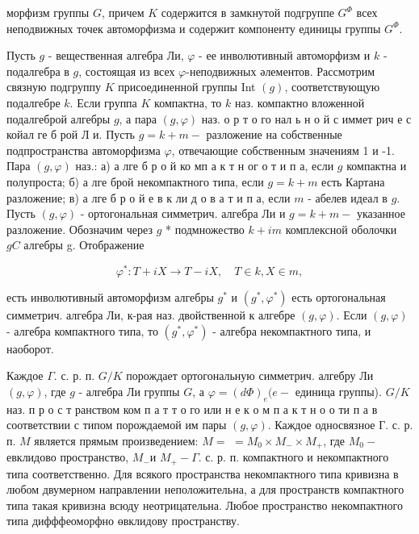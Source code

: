 \documentclass[10pt]{article}
\begin{document}
морфизм группы $G$, причем $K$ содержится в замкнутой подгруппе $G^{\Phi}$ всех неподвижных точек автоморфизма и содержит компоненту единицы группы $G^{\Phi}$.



Пусть $g$ - вещественная алгебра Ли, $\varphi$ - ее инволютивный автоморфизм и $k$ - подалгебра в $g$, состоящая из всех $\varphi$-неподвижных әлементов. Рассмотрим связную подгруппу $K$ присоединенной группы Int $(g)$, соответствующую подалгебре $k$. Если группа $K$ компактна, то $k$ наз. компактно вложенной подалгеброй алгебры $g$, а пара $(g, \varphi)$ наз. о р т о го нал ь н о й с иммет рич е с койал ге б рой Л и. Пусть $g=k+m-$ разложение на собственные подпространства автоморфизма $\varphi$, отвечающие собственным значениям 1 и -1. Пара $(g, \varphi)$ наз.: а) а лге б р о й ко мп а к т н ог о т и п а, если $g$ компактна и полупроста; б) а лге брой некомпактного типа, если $g=k+m$ есть Картана разложение; в) а лге б р о й е в к ли д о в а т и п а, если $m$ - абелев идеал в $g$. Пусть $(g, \varphi)$ - ортогональная симметрич. алгебра Ли и $g=k+m-$ указанное разложение. Обозначим через $g$ * подмножество $k+i m$ комплексной оболочки $g C$ алгебры g. Отображение



\[

\varphi^{*}: T+i X \longrightarrow T-i X, \quad T \in k, X \in m,

\]



есть инволютивный автоморфизм алгебры $g^{*}$ и $\left(g^{*}, \varphi^{*}\right)$ есть ортогональная симметрич. алгебра Ли, к-рая наз. двойственной к алгебре $(g, \varphi)$. Если $(g, \varphi)$ - алгебра компактного типа, то $\left(g^{*}, \varphi^{*}\right)$ - алгебра некомпактного типа, и наоборот.



Каждое $\Gamma$. с. р. п. $G / K$ порождает ортогональную симметрич. алгебру Ли $(g, \varphi)$, где $g$ - алгебра Ли группы $G$, а $\varphi=(d \Phi)_{e}(e-$ единица группы). $G / K$ наз. п р о с т ранством ком п а т т о го или н е к о м п а к т н о о ти п а в соответствии с типом порождаемой им пары $(g, \varphi)$. Каждое односвязное Г. с. р. п. $M$ является прямым произведением: $M=$ $=M_{0} \times M_{-} \times M_{+}$, где $M_{0}-$ евклидово пространство, $M_{-}$и $M_{+}-\Gamma$. с. р. п. компактного и некомпактного типа соответственно. Для всякого пространства некомпактного типа кривизна в любом двумерном направлении неположительна, а для пространств компактного типа такая кривизна всюду неотрицательна. Любое пространство некомпактного типа дифффеоморфно өвклидову пространству.
\end{document}
